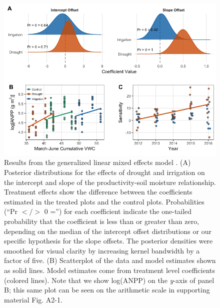 \documentclass[fleqn,10pt,lineno]{wlpeerj} %
\begin{document}
\begin{figure}[!ht]
  \centering
      \includegraphics[width=5in]{../figures/glmm_main_results.png}
  \caption{Results from the generalized linear mixed effects model . (A) Posterior distributions for the effects of drought and irrigation on the intercept and slope of the productivity-soil moisture relationship. Treatment effects show the difference between the coefficients estimated in the treated plots and the control plots. Probabilities (``Pr $</>$ 0 ='') for each coefficient indicate the one-tailed probability that the coefficient is less than or greater than zero, depending on the median of the intercept offset distributions or our specific hypothesis for the slope offsets. The posterior densities were smoothed for visual clarity by increasing kernel bandwidth by a factor of five. (B) Scatterplot of the data and model estimates shown as solid lines. Model estimates come from treatment level coefficients (colored lines). Note that we show log(ANPP) on the \emph{y}-axis of panel B; this same plot can be seen on the arithmetic scale in supporting material Fig. A2-1. }
\end{figure}

\newpage{}
\end{document}
